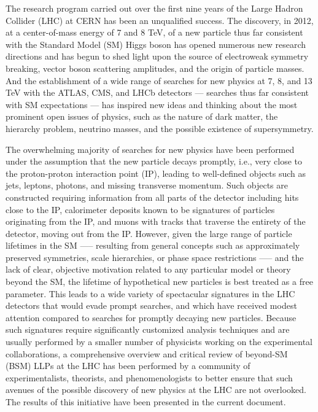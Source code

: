 The research program carried out over the first nine years of the Large Hadron Collider (LHC) at CERN has been an unqualified success.
The discovery, in 2012, at a center-of-mass energy of 7 and 8 TeV, of a new particle thus far consistent with the Standard Model (SM) Higgs boson has opened numerous new research directions and has begun to shed light upon the source of electroweak symmetry breaking, vector boson scattering amplitudes, and the origin of particle masses.
And the establishment of a wide range of searches for new physics at 7, 8, and 13 TeV with the ATLAS, CMS, and LHCb detectors — searches thus far consistent with SM expectations — has inspired new ideas and thinking about the most prominent open issues of physics, such as the nature of dark matter, the hierarchy problem, neutrino masses, and the possible existence of supersymmetry.

The overwhelming majority of searches for new physics have been performed under the assumption that the new particle decays promptly, i.e., very close to the proton-proton interaction point (IP), leading to well-defined objects such as jets, leptons, photons, and missing transverse momentum.
Such objects are constructed requiring information from all parts of the detector including hits close to the IP, calorimeter deposits known to be signatures of particles originating from the IP, and muons with tracks that traverse the entirety of the detector, moving out from the IP.
However, given the large range of particle lifetimes in the SM —-- resulting from general concepts such as approximately preserved symmetries, scale hierarchies, or phase space restrictions —-- and the lack of clear, objective motivation related to any particular model or theory beyond the SM, the lifetime of hypothetical new particles is best treated as a free parameter.
This leads to a wide variety of spectacular signatures in the LHC detectors that would evade prompt searches, and which have received modest attention compared to searches for promptly decaying new particles.
Because such signatures require significantly customized analysis techniques and are usually performed by a smaller number of physicists working on the experimental collaborations, a comprehensive overview and critical review of beyond-SM (BSM) LLPs at the LHC has been performed by a community of experimentalists, theorists, and phenomenologists to better ensure that such avenues of the possible discovery of new physics at the LHC are not overlooked.
The results of this initiative have been presented in the current document.

